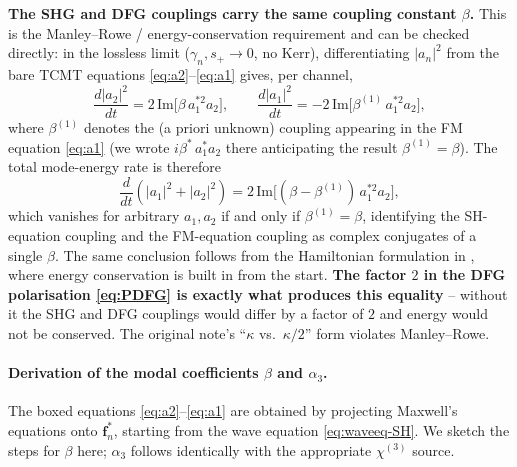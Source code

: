 \documentclass[11pt,a4paper]{article}
\newcommand{\bvec}[1]{\mathbf{#1}}
\newcommand{\f}{\bvec{f}}
\newcommand{\chithree}{\chi^{(3)}}
\begin{document}
\textbf{The SHG and DFG couplings carry the same coupling constant
$\beta$.}  This is the Manley--Rowe / energy-conservation requirement and
can be checked directly: in the lossless limit ($\gamma_n,s_+\!\to 0$, no
Kerr), differentiating $|a_n|^{2}$ from the bare TCMT equations
\eqref{eq:a2}--\eqref{eq:a1} gives, per channel,
\begin{equation}
  \frac{d|a_2|^{2}}{dt}=2\,\mathrm{Im}\bigl[\beta\,a_1^{*2}a_2\bigr],
  \qquad
  \frac{d|a_1|^{2}}{dt}=-2\,\mathrm{Im}\bigl[\beta^{(1)}\,a_1^{*2}a_2\bigr],
  \label{eq:MR-perchannel}
\end{equation}
where $\beta^{(1)}$ denotes the (a priori unknown) coupling appearing
in the FM equation \eqref{eq:a1} (we wrote $i\beta^{*}\,a_1^{*}a_2$
there anticipating the result $\beta^{(1)}=\beta$).  The total
mode-energy rate is therefore
\begin{equation}
  \frac{d}{dt}(|a_1|^{2}+|a_2|^{2})
  =2\,\mathrm{Im}\!\bigl[(\beta-\beta^{(1)})\,a_1^{*2}a_2\bigr],
  \label{eq:MR-total}
\end{equation}
which vanishes for arbitrary $a_1,a_2$ if and only if
$\beta^{(1)}=\beta$, identifying the SH-equation coupling and the
FM-equation coupling as complex conjugates of a single $\beta$.  The
same conclusion follows from the Hamiltonian formulation in
\cite[Eqs.~8--9]{Rodriguez2007}, where energy conservation is built
in from the start.  \textbf{The factor $2$ in the DFG polarisation
\eqref{eq:PDFG} is exactly what produces this equality} -- without
it the SHG and DFG couplings would differ by a factor of $2$ and
energy would not be conserved.  The original note's
``$\kappa$ vs.\ $\kappa/2$'' form violates Manley--Rowe.

\paragraph{Derivation of the modal coefficients $\beta$ and $\alpha_3$.}
The boxed equations \eqref{eq:a2}--\eqref{eq:a1} are obtained by
projecting Maxwell's equations onto $\f_n^*$, starting from the wave
equation \eqref{eq:waveeq-SH}.  We sketch the steps for $\beta$ here;
$\alpha_3$ follows identically with the appropriate $\chithree$ source.
\end{document}
